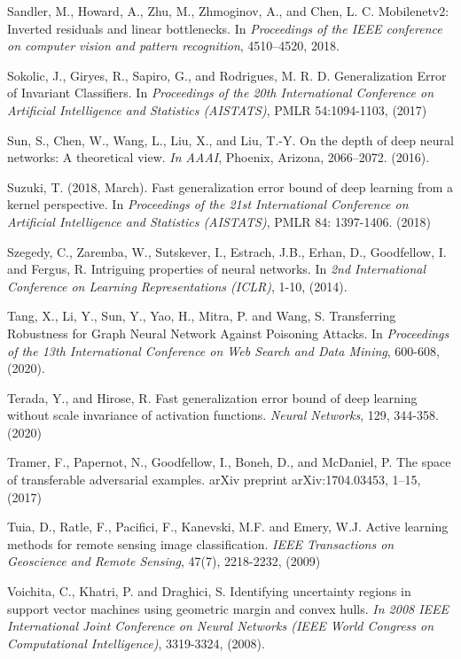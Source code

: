 \documentclass[12pt]{article}
\begin{document}
\begin{thebibliography}{}
Sandler, M., Howard, A., Zhu, M., Zhmoginov, A., and Chen,
L. C. Mobilenetv2: Inverted residuals and linear
bottlenecks. In {\it Proceedings of the IEEE conference on computer vision
and pattern recognition}, 4510--4520, 2018.
  
  Sokolic, J., Giryes, R., Sapiro, G., and Rodrigues, M. R. D.
  Generalization Error of Invariant Classifiers. In {\it Proceedings
    of the 20th International Conference on Artificial Intelligence
    and Statistics (AISTATS)}, PMLR 54:1094-1103, (2017)  

Sun, S., Chen, W., Wang, L., Liu, X., and Liu, T.-Y.  On the depth of
deep neural networks: A theoretical view. {\it In AAAI}, Phoenix, Arizona,
2066–2072. (2016).  
  
 Suzuki, T. (2018, March). Fast generalization error bound of deep
 learning from a kernel perspective. In {\it Proceedings
    of the 21st International Conference on
 Artificial Intelligence and Statistics (AISTATS)}, PMLR 84: 1397-1406. (2018)  
  
Szegedy, C., Zaremba, W., Sutskever, I., Estrach, J.B., Erhan, D.,
Goodfellow, I. and Fergus, R. Intriguing properties of
neural networks. In {\it 2nd International Conference on Learning
Representations (ICLR)}, 1-10, (2014).

Tang, X., Li, Y., Sun, Y., Yao, H., Mitra, P. and Wang,
S. Transferring Robustness for Graph Neural Network Against Poisoning
Attacks. In {\it Proceedings of the 13th International Conference on Web
Search and Data Mining}, 600-608, (2020).

Terada, Y., and Hirose, R.  Fast generalization error bound of
deep learning without scale invariance of activation functions. {\it Neural
Networks}, 129, 344-358. (2020)

Tramer, F., Papernot, N., Goodfellow, I., Boneh, D., and McDaniel,
P. The space of transferable adversarial examples. arXiv preprint
arXiv:1704.03453, 1--15, (2017)    

  Tuia, D., Ratle, F., Pacifici, F., Kanevski, M.F. and Emery, W.J.
  Active learning methods for remote sensing image
  classification. {\it IEEE Transactions on Geoscience and Remote Sensing},
  47(7), 2218-2232, (2009)

  Voichita, C., Khatri, P. and Draghici, S. Identifying
  uncertainty regions in support vector machines using geometric
  margin and convex hulls. {\it In 2008 IEEE International Joint Conference
  on Neural Networks (IEEE World Congress on Computational
  Intelligence)}, 3319-3324, (2008).


\end{thebibliography}
\end{document}

